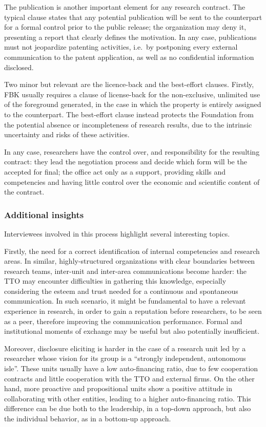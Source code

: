 The publication is another important element for any research contract. The typical clause states that any potential publication will be sent to the counterpart for a formal control prior to the public release; the organization may deny it, presenting a report that clearly defines the motivation. In any case, publications must not jeopardize patenting activities, i.e.\ by postponing every external communication to the patent application, as well as no confidential information disclosed.

Two minor but relevant are the licence-back and the best-effort clauses. Firstly, FBK usually requires a clause of license-back for the non-exclusive, unlimited use of the foreground generated, in the case in which the property is entirely assigned to the counterpart. The best-effort clause instead protects the Foundation from the potential absence or incompleteness of research results, due to the intrinsic uncertainty and risks of these activities.

In any case, researchers have the control over, and responsibility for the resulting contract: they lead the negotiation process and decide which form will be the accepted for final; the office act only as a support, providing skills and competencies and having little control over the economic and scientific content of the contract.

\subsubsection{Additional insights}

Interviewees involved in this process highlight several interesting topics.

Firstly, the need for a correct identification of internal competencies and research areas. In similar, highly-structured organizations with clear boundaries between research teams, inter-unit and inter-area communications become harder: the TTO may encounter difficulties in gathering this knowledge, especially considering the esteem and trust needed for a continuous and spontaneous communication. In such scenario, it might be fundamental to have a relevant experience in research, in order to gain a reputation before researchers, to be seen as a peer, therefore improving the communication performance. Formal and institutional moments of exchange may be useful but also potentially insufficient.

Moreover, disclosure eliciting is harder in the case of a research unit led by a researcher whose vision for its group is a \enquote{strongly independent, autonomous isle}. These units usually have a low auto-financing ratio, due to few cooperation contracts and little cooperation with the TTO and external firms. On the other hand, more proactive and propositional units show a positive attitude in collaborating with other entities, leading to a higher auto-financing ratio. This difference can be due both to the leadership, in a top-down approach, but also the individual behavior, as in a bottom-up approach. 

